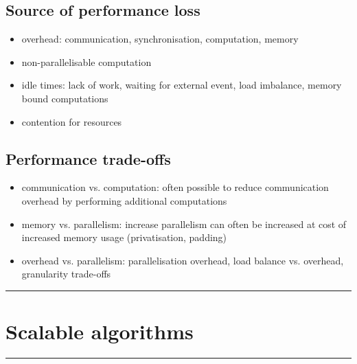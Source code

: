 \documentclass[10pt, multicolumn, a4paper]{article}
\begin{document}
\begin{multicols}{2}
	\subsection*{Source of performance loss}
	\begin{itemize}
	\item overhead: communication, synchronisation, computation, memory
	\item non-parallelisable computation
	\item idle times: lack of work, waiting for external event, load imbalance, memory bound computations
	\item contention for resources
	\end{itemize}
	\subsection*{Performance trade-offs}
	\begin{itemize}
	\item communication vs. computation: often possible to reduce communication overhead by performing additional computations
	\item memory vs. parallelism: increase parallelism can often be increased at cost of increased memory usage (privatisation, padding)
	\item overhead vs. parallelism: parallelisation overhead, load balance vs. overhead, granularity trade-offs
	\end{itemize}
\end{multicols}

\setcounter{section}{8}
\hrule
\section{Scalable algorithms}
\hrule 
\end{document}
